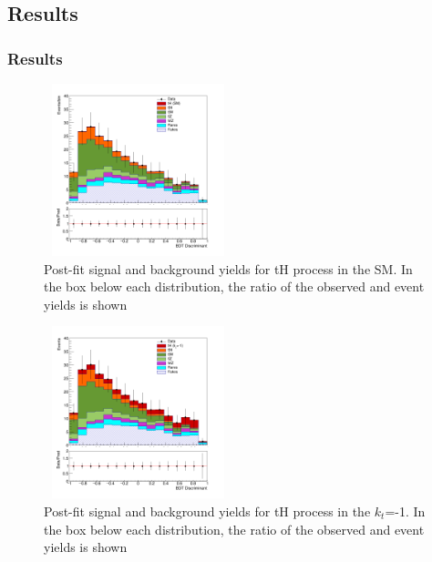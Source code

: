 \documentclass[11pt]{beamer}
\begin{document}
\begin{frame}
\subsection{Results}
\frametitle{Results}
\begin{minipage}{0.4\textwidth}
	\begin{center}
	\begin{figure}
		\includegraphics[width=5.5cm,height=5cm]{figures/simple.png}
		\caption*{\tiny{Post-fit signal and background yields for tH process in the SM. In the
			box below each distribution, the ratio of the observed and  event yields is shown}}
	\end{figure}
\end{center}
\end{minipage}\hfill \quad
\begin{minipage}{0.4\textwidth}
	\begin{center}
	\begin{figure}
		\includegraphics[width=5.5cm,height=5cm]{figures/simple-kt-1.png}
		\caption*{\tiny{Post-fit signal and background yields for tH process in the $k_t$=-1. 
	In the box below each distribution, the ratio of the observed and event yields is shown}}
	\end{figure}
\end{center}
\end{minipage}
\end{frame}
\end{document}

